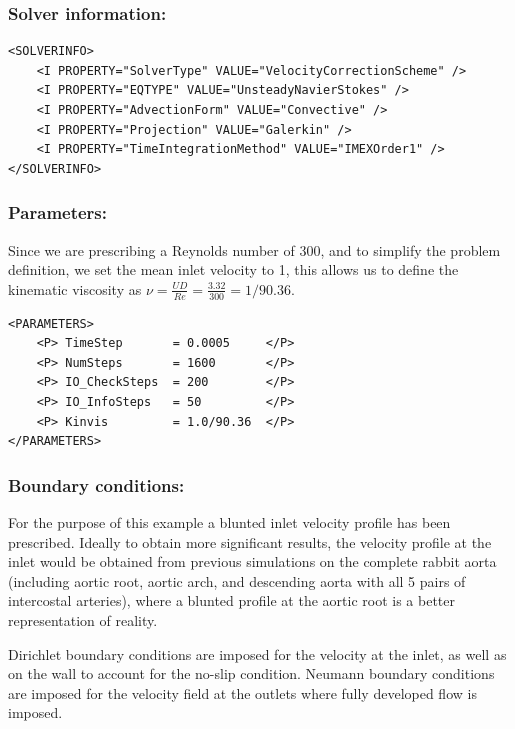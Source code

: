 \subsubsection{Solver information:~}
\begin{lstlisting}[style=XMLStyle]
<SOLVERINFO>
    <I PROPERTY="SolverType" VALUE="VelocityCorrectionScheme" />
    <I PROPERTY="EQTYPE" VALUE="UnsteadyNavierStokes" />
    <I PROPERTY="AdvectionForm" VALUE="Convective" />
    <I PROPERTY="Projection" VALUE="Galerkin" />
    <I PROPERTY="TimeIntegrationMethod" VALUE="IMEXOrder1" />
</SOLVERINFO>
\end{lstlisting}

\subsubsection{Parameters:~} Since we are prescribing a Reynolds number of 300, and to simplify the problem definition, we set the mean inlet velocity to 1, this allows us to define the kinematic viscosity as $\nu = \frac{UD}{Re}=\frac{3.32}{300} = 1/90.36$.

\begin{lstlisting}[style=XMLStyle]
<PARAMETERS>
    <P> TimeStep       = 0.0005     </P>
    <P> NumSteps       = 1600       </P>
    <P> IO_CheckSteps  = 200        </P>
    <P> IO_InfoSteps   = 50         </P>
    <P> Kinvis         = 1.0/90.36  </P>
</PARAMETERS>
\end{lstlisting}

\subsubsection{Boundary conditions:~} For the purpose of this example a blunted inlet velocity profile has been prescribed. Ideally to obtain more significant results, the velocity profile at the inlet would be obtained from previous simulations on the complete rabbit aorta (including aortic root, aortic arch, and descending aorta with all 5 pairs of intercostal arteries), where a blunted profile at the aortic root is a better representation of reality.

Dirichlet boundary conditions are imposed for the velocity at the inlet, as well as on the wall to account for the no-slip condition. Neumann boundary conditions are imposed for the velocity field at the outlets where fully developed flow is imposed.

